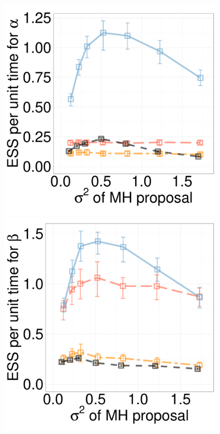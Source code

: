 \begin{figure}[H]
\begin{minipage}[hp]{0.24\linewidth}
	\end{minipage}
  \begin{minipage}[hp]{0.24\linewidth}
  \centering
    \includegraphics [width=0.99\textwidth, angle=0]{figs/new_experiment_figs/exp_alpha_dim10_k2.pdf}
	\end{minipage}
  \begin{minipage}[hp]{0.24\linewidth}
  \centering
    \includegraphics [width=0.99\textwidth, angle=0]{figs/new_experiment_figs/exp_beta_dim10_k2.pdf}

\end{minipage}
\end{figure}

